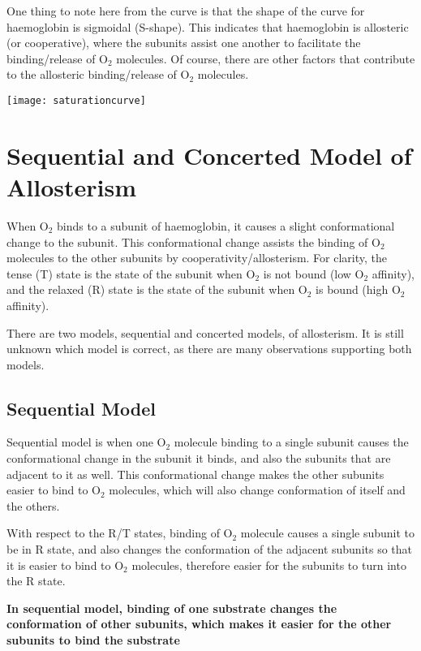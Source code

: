 \documentclass[a4paper, 12pt]{report}
\begin{document}
One thing to note here from the curve is that the shape of the curve for haemoglobin is sigmoidal (S-shape).
This indicates that haemoglobin is allosteric (or cooperative), where the subunits assist one another to facilitate the binding/release of O$_2$ molecules.
Of course, there are other factors that contribute to the allosteric binding/release of O$_2$ molecules.

\begin{center}
\texttt{[image: saturationcurve]}
\end{center}

\section{Sequential and Concerted Model of \-Allosterism}

When O$_2$ binds to a subunit of haemoglobin, it causes a slight conformational change to the subunit.
This conformational change assists the binding of O$_2$ molecules to the other subunits by cooperativity/allosterism.
For clarity, the tense (T) state is the state of the subunit when O$_2$ is not bound (low O$_2$ affinity), and the relaxed (R) state is the state of the subunit when O$_2$ is bound (high O$_2$ affinity).

There are two models, sequential and concerted models, of allosterism.
It is still unknown which model is correct, as there are many observations supporting both models.

\subsection{Sequential Model}

Sequential model is when one O$_2$ molecule binding to a single subunit causes the conformational change in the subunit it binds, and also the subunits that are adjacent to it as well.
This conformational change makes the other subunits easier to bind to O$_2$ molecules, which will also change conformation of itself and the others.

With respect to the R/T states, binding of O$_2$ molecule causes a single subunit to be in R state, and also changes the conformation of the adjacent subunits so that it is easier to bind to O$_2$ molecules, therefore easier for the subunits to turn into the R state.

\textbf{In sequential model, binding of one substrate changes the conformation of other subunits, which makes it easier for the other subunits to bind the substrate}
\end{document}
